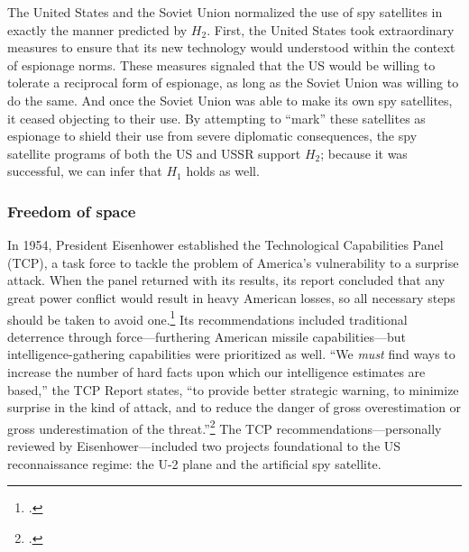 \documentclass[12pt]{extarticle}
\begin{document}
The United States and the Soviet Union normalized the use of spy satellites in exactly the manner predicted by $H_2$. First, the United States took extraordinary measures to ensure that its new technology would understood within the context of espionage norms. These measures signaled that the US would be willing to tolerate a reciprocal form of espionage, as long as the Soviet Union was willing to do the same. And once the Soviet Union was able to make its own spy satellites, it ceased objecting to their use. By attempting to \enquote{mark} these satellites as espionage to shield their use from severe diplomatic consequences, the spy satellite programs of both the US and USSR support $H_2$; because it was successful, we can infer that $H_1$ holds as well.

\subsubsection{Freedom of space}

In 1954, President Eisenhower established the Technological Capabilities Panel (TCP), a task force to tackle the problem of America's vulnerability to a surprise attack. When the panel returned with its results, its report concluded that any great power conflict would result in heavy American losses, so all necessary steps should be taken to avoid one.\footcite[67. The TCP report is also variously referred to as the \enquote{Killian Report,} \enquote{Surprise Attack Study,} or its formal title, \enquote{Meeting the Threat of a Surprise Attack.}]{killian_sputnik_1977} Its recommendations included traditional deterrence through force---furthering American missile capabilities---but intelligence-gathering capabilities were prioritized as well. ``We \emph{must} find ways to increase the number of hard facts upon which our intelligence estimates are based,'' the TCP Report states, ``to provide better strategic warning, to minimize surprise in the kind of attack, and to reduce the danger of gross overestimation or gross underestimation of the threat.''\footcite{technological_capabilities_panel_meeting_1955} The TCP recommendations---personally reviewed by Eisenhower---included two projects foundational to the US reconnaissance regime: the U-2 plane and the artificial spy satellite.
\end{document}

